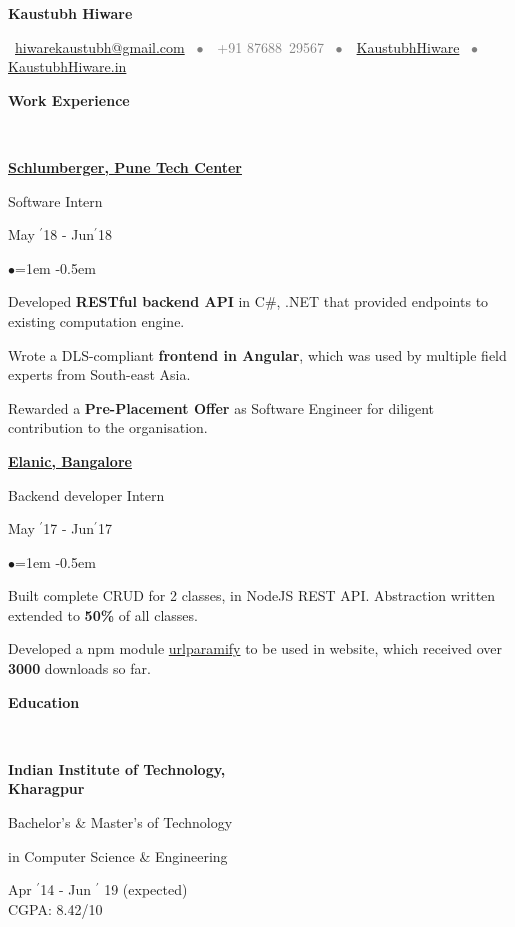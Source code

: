 \documentclass[11pt, a4paper]{resume}
\newcommand{\important}[1]{
	\textcolor{mypurple}{#1}
}
\newcommand{\greyed}[1]{
	\textcolor{gray}{#1}
}
\newcommand{\titleX}[1]{
	\begin{LARGE}
    	\important{\centerline{\textbf{#1}}}
    \end{LARGE}
}
\newcommand{\fillit}[1]{
	\leavevmode\xleaders\hbox{#1}\hfill\kern0pt
}
\newcommand{\sectionTitle}[1]{
	\begin{Large}
    	\important{\textbf{#1}} 
    \end{Large}
    \important{\rlap{\rule[.5ex]{\linegoal}{0.5pt}}{}}
     \vspace{0.1em}\\
}
\newcommand{\textbox}[1]{
  \parbox{.333\textwidth}{#1}
}
\newenvironment{Jobsection}[3]{ %
\noindent\textbox{\bf #1\hfill}\textbox{\hfil #2\hfil}\textbox{\hfill #3}
  \begin{list}{$\bullet$}{\leftmargin=1em} %
   \itemsep -0.5em \vspace{-0.5em} %
  }{
  \end{list}
  \vspace{0.2em} %
}
\newcommand{\education}[3]{ %
\noindent\parbox{.3\textwidth}{\bf #1\hfill}\parbox{.45\textwidth}{\hfil #2\hfil}\parbox{.25\textwidth}{\hfill #3}
}
\begin{document}
\titleX{Kaustubh Hiware}
\normalsize
\vspace{6pt}
\greyed{\centerline{\faEnvelopeO \, \href{mailto:hiwarekaustubh@gmail.com}{ hiwarekaustubh@gmail.com} \, $\bullet$ \,\faMobile\, +91 87688\, 29567 \, $\bullet$ \,\faGithub \, \href{https://github.com/kaustubhhiware}{KaustubhHiware} \,  $\bullet$ \, \faGlobe \, \href{https://kaustubhhiware.in}{KaustubhHiware.in}}}

\vspace{-2em}
\sectionTitle{Work Experience}
\begin{Jobsection}{\href{https://drive.google.com/file/d/1EcfIC_g8bx3whaxMdOkFyZx4TCqA1RAq/view?usp=sharing}{Schlumberger, Pune Tech Center}}{Software Intern}{ May $^{\prime}$18 - Jun$^{\prime}$18}
\item Developed {\bf RESTful backend API} in C\#, .NET that provided endpoints to existing computation engine.
\item Wrote a DLS-compliant {\bf frontend in Angular}, which was used by multiple field experts from South-east Asia.
\item Rewarded a {\bf Pre-Placement Offer} as Software Engineer for diligent contribution to the organisation.
\end{Jobsection}

\begin{Jobsection}{\href{https://drive.google.com/file/d/0B5iU6cWw36rOVWZIcllPY3RSd2c/view?usp=sharing}{Elanic, Bangalore}}{Backend developer Intern}{ May $^{\prime}$17 - Jun$^{\prime}$17}
\item Built complete CRUD for 2 classes, in NodeJS REST API. Abstraction written extended to {\bf 50\%} of all classes.
\item Developed a npm module \href{https://www.npmjs.com/package/urlparamify}{urlparamify} to be used in website, which received over {\bf 3000} downloads so far.
\end{Jobsection}

\sectionTitle{Education\vspace{0.5em}}
\education{Indian Institute of Technology,\\ Kharagpur}{\centerline{Bachelor's \& Master's of Technology} \centerline{in Computer Science \& Engineering}}{Apr $^{\prime}$14 - Jun $^{\prime}$ 19 (expected) \\\hspace*{\fill} CGPA: 8.42/10}
\end{document}
